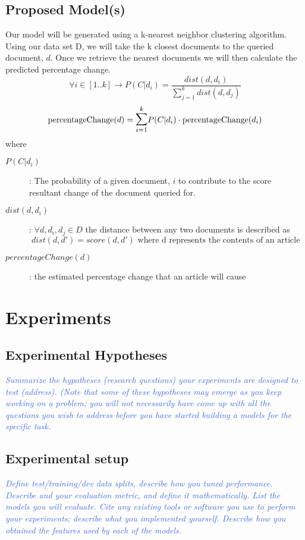 \documentclass[11pt,letterpaper]{article}
\newcommand{\blue}[1]{\textcolor{RoyalBlue}{#1}}
\newcommand{\instructions}[1]{\blue{\textit{#1}}}
\begin{document}
\subsection{Proposed Model(s)}
\label{sec:proposed-models}
Our model will be generated using a k-nearest neighbor clustering algorithm.  Using our data set D, we will take the k closest documents to the queried document, \(d\). Once we retrieve the nearest documents we will then calculate the predicted percentage change.
\[
	 \forall i \in [1..k] \rightarrow P(C | d_i) = \frac{ dist(d,d_i) }{\sum^k_{j=1} dist(d, d_j)}
\]
\[
	\text{percentageChange}(d) = \mathlarger{\mathlarger{\sum}}^k_{i=1} P(C | d_i) \cdot \text{percentageChange}(d_i) 
\]
where
\begin{description}
	\item[\(P(C | d_i)\)] : The probability of a given document, \( i \) to contribute to the score resultant change of the document queried for.
	\item[\textbf{\(dist(d,d_i)\)}] : \( \forall d, d_i, d_j \in D \) the distance between any two documents is described as
	\[
		dist(d, d') = score(d, d') \text{ where d represents the contents of an article } 
	\]
	\item[\(percentageChange(d)\)] : the estimated percentage change that an article will cause
\end{description}

\section{Experiments}
\label{sec:experiments}

\subsection{Experimental Hypotheses}
\label{sec:exper-hypoth}
\instructions{Summarize the hypotheses (research questions) your experiments are designed to test (address). (Note that some of these hypotheses may emerge as you keep working on a problem; you will not necessarily have come up with all the questions you wish to address before you have started building a models for the specific task.}

\subsection{Experimental setup}
\label{sec:experimental-setup}
\instructions{Define test/training/dev data splits, describe how you tuned performance. Describe and your evaluation metric, and define it mathematically.
List the models you will evaluate. Cite any existing tools or software you use to perform your experiments; describe what you implemented yourself. Describe how you obtained the features used by each of the models.}
\end{document}
